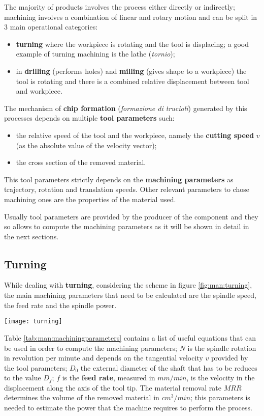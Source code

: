 	The majority of products involves the  process either directly or indirectly; machining involves a combination of linear and rotary motion and can be split in 3 main operational categories:
	\begin{itemize}
		\item \textbf{turning} where the workpiece is rotating and the tool is displacing; a good example of turning machining is the lathe (\textit{tornio});
		\item in \textbf{drilling} (performs holes) and \textbf{milling} (gives shape to a workpiece) the tool is rotating and there is a combined relative displacement between tool and workpiece.
	\end{itemize}
	The mechanism of \textbf{chip formation} (\textit{formazione di trucioli}) generated by this processes depends on multiple \textbf{tool parameters} such:
	\begin{itemize}
		\item the relative speed of the tool and the workpiece, namely the \textbf{cutting speed} $v$ (as the absolute value of the velocity vector);
		\item the cross section of the removed material.
	\end{itemize}
	This tool parameters strictly depends on the \textbf{machining parameters} as trajectory, rotation and translation speeds. Other relevant parameters to chose machining ones are the properties of the material used.
	
	Usually tool parameters are provided by the producer of the component and they so allows to compute the machining parameters as it will be shown in detail in the next sections.
	
	\subsection*{Turning}
		
		While dealing with \textbf{turning}, considering the scheme in figure \ref{fig:man:turning}, the main machining parameters that need to be calculated are the spindle speed, the feed rate and the spindle power.
		
		\begin{SCfigure}[2][bht]
			\centering \texttt{[image: turning]}
			\caption{main dimensions and parameters used for the calculation on turning's machining parameters.} \label{fig:man:turning}
		\end{SCfigure}
		
		Table \ref{tab:man:machiningparameters} contains a list of useful equations that can be used in order to compute the machining parameters; $N$ is the spindle rotation in revolution per minute and depends on the tangential velocity $v$ provided by the tool parameters; $D_0$ the external diameter of the shaft that has to be reduces to the value $D_f$; $f$ is the \textbf{feed rate}, measured in $mm/min$, is the velocity in the displacement along the axis of the tool tip.  The material removal rate $MRR$ determines the volume of the removed material in $cm^3/min$; this parameters is needed to estimate the power that the machine requires to perform the process.
		
